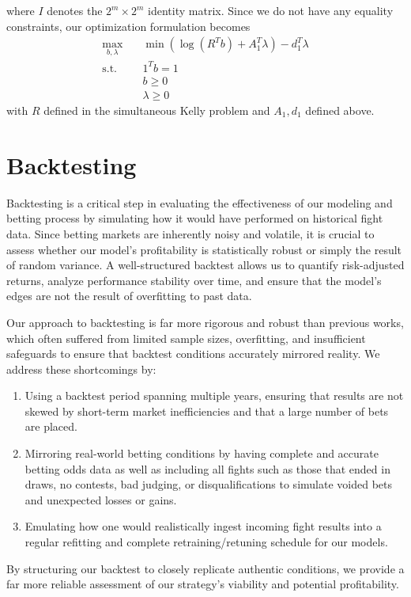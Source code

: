 \documentclass[12pt,twoside]{report}
\begin{document}
where $I$ denotes the $2^m \times 2^m$ identity matrix. Since we do not have any equality constraints, our optimization formulation becomes
$$\begin{aligned}
    \max_{b, \lambda} \quad & \min(\log(R^T b) +  A_1^T \lambda)  - d_1^T \lambda\\
    \textrm{s.t.} \quad & 1^T b = 1 \\
                        & b \geq 0 \\
                        & \lambda \geq 0
\end{aligned}$$
with $R$ defined in the simultaneous Kelly problem and $A_1, d_1$ defined above.

\section{Backtesting}

Backtesting is a critical step in evaluating the effectiveness of our modeling and betting process by simulating how it would have performed on historical fight data. Since betting markets are inherently noisy and volatile, it is crucial to assess whether our model’s profitability is statistically robust or simply the result of random variance. A well-structured backtest allows us to quantify risk-adjusted returns, analyze performance stability over time, and ensure that the model’s edges are not the result of overfitting to past data.

Our approach to backtesting is far more rigorous and robust than previous works, which often suffered from limited sample sizes, overfitting, and insufficient safeguards to ensure that backtest conditions accurately mirrored reality. We address these shortcomings by:
\begin{enumerate}
    \item Using a backtest period spanning multiple years, ensuring that results are not skewed by short-term market inefficiencies and that a large number of bets are placed.

    \item Mirroring real-world betting conditions by having complete and accurate betting odds data as well as including all fights such as those that ended in draws, no contests, bad judging, or disqualifications to simulate voided bets and unexpected losses or gains.

    \item Emulating how one would realistically ingest incoming fight results into a regular refitting and complete retraining/retuning schedule for our models.
\end{enumerate}
By structuring our backtest to closely replicate authentic conditions, we provide a far more reliable assessment of our strategy’s viability and potential profitability.
\end{document}
